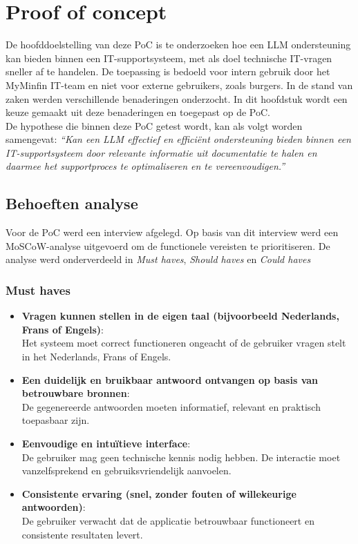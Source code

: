 \chapter{Proof of concept}
\label{ch:proof-of-concept}

De hoofddoelstelling van deze PoC is te onderzoeken hoe een LLM ondersteuning kan bieden binnen een IT-supportsysteem, met als doel technische IT-vragen sneller af te handelen. De toepassing is bedoeld voor intern gebruik door het MyMinfin IT-team en niet voor externe gebruikers, zoals burgers. In de stand van zaken werden verschillende benaderingen onderzocht. In dit hoofdstuk wordt een keuze gemaakt uit deze benaderingen en toegepast op de PoC.
\\[1em]
De hypothese die binnen deze PoC getest wordt, kan als volgt worden samengevat:
\textit{“Kan een LLM effectief en efficiënt ondersteuning bieden binnen een IT-supportsysteem door relevante informatie uit documentatie te halen en daarmee het supportproces te optimaliseren en te vereenvoudigen.”}

\section{Behoeften analyse}
Voor de PoC werd een interview afgelegd. Op basis van dit interview werd een MoSCoW-analyse uitgevoerd om de functionele vereisten te prioritiseren. De analyse werd onderverdeeld in \textit{Must haves}, \textit{Should haves} en \textit{Could haves}

\subsection{Must haves}
\begin{itemize}
    \item \textbf{Vragen kunnen stellen in de eigen taal (bijvoorbeeld Nederlands, Frans of Engels)}:\\ 
    Het systeem moet correct functioneren ongeacht of de gebruiker vragen stelt in het Nederlands, Frans of Engels.
    \item \textbf{Een duidelijk en bruikbaar antwoord ontvangen op basis van betrouwbare bronnen}:\\ 
    De gegenereerde antwoorden moeten informatief, relevant en praktisch toepasbaar zijn.
    \item \textbf{Eenvoudige en intuïtieve interface}:\\  
    De gebruiker mag geen technische kennis nodig hebben. De interactie moet vanzelfsprekend en gebruiksvriendelijk aanvoelen.
    \item \textbf{Consistente ervaring (snel, zonder fouten of willekeurige antwoorden)}:\\  
    De gebruiker verwacht dat de applicatie betrouwbaar functioneert en consistente resultaten levert.
\end{itemize}

